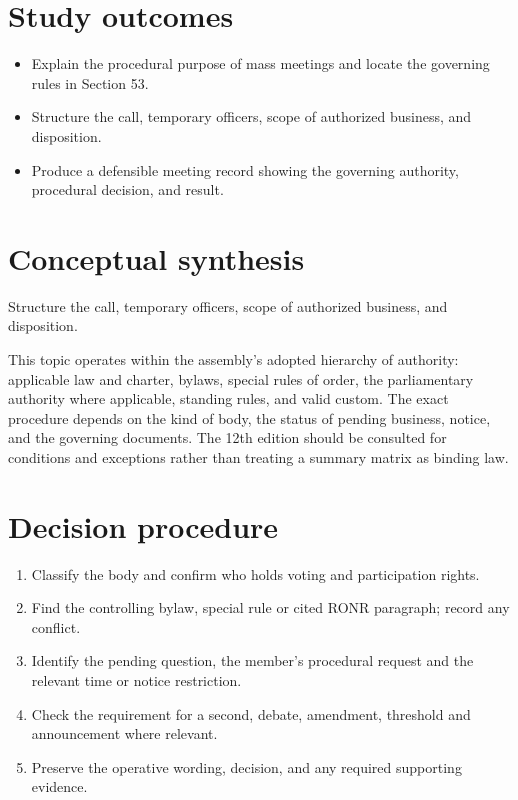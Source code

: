 \documentclass[11pt]{article}
\begin{document}
\SuiteOpen
{}
\section{Study outcomes}
\begin{itemize}[leftmargin=*,itemsep=4pt]
\item Explain the procedural purpose of mass meetings and locate the governing rules in Section 53.
\item Structure the call, temporary officers, scope of authorized business, and disposition.
\item Produce a defensible meeting record showing the governing authority, procedural decision, and result.
\end{itemize}

\section{Conceptual synthesis}
Structure the call, temporary officers, scope of authorized business, and disposition.

This topic operates within the assembly’s adopted hierarchy of authority: applicable law and charter, bylaws, special rules of order, the parliamentary authority where applicable, standing rules, and valid custom. The exact procedure depends on the kind of body, the status of pending business, notice, and the governing documents. The 12th edition should be consulted for conditions and exceptions rather than treating a summary matrix as binding law.
\section{Decision procedure}
\begin{enumerate}[leftmargin=*,itemsep=4pt]
\item Classify the body and confirm who holds voting and participation rights.
\item Find the controlling bylaw, special rule or cited RONR paragraph; record any conflict.
\item Identify the pending question, the member’s procedural request and the relevant time or notice restriction.
\item Check the requirement for a second, debate, amendment, threshold and announcement where relevant.
\item Preserve the operative wording, decision, and any required supporting evidence.
\end{enumerate}
\end{document}
